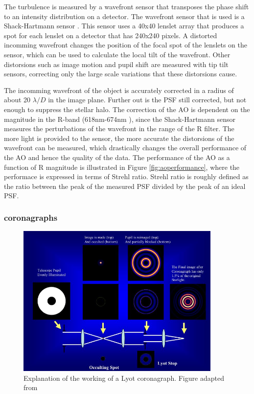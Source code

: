\documentclass[twoside,single]{lion-msc}
\begin{document}
The turbulence is measured by a wavefront sensor that transposes the phase shift to an intensity distribution on a detector. The wavefront sensor that is used is a Shack-Hartmann sensor \citep{Anugu2013}. This sensor uses a 40x40 lenslet array that produces a spot for each lenslet on a detector that has 240x240 pixels. A distorted incomming wavefront changes the position of the focal spot of the lenslets on the sensor, which can be used to calculate the local tilt of the wavefront. Other distorsions such as image motion and pupil shift are measured with tip tilt sensors, correcting only the large scale variations that these distorsions cause.
\bigskip

The incomming wavefront of the object is accurately corrected in a radius of about 20 $\lambda/D$ in the image plane. Further out is the PSF still corrected, but not enough to suppress the stellar halo. The correction of the AO is dependent on the magnitude in the R-band (618nm-674nm \citep{Mouillet2013}), since the Shack-Hartmann sensor measures the perturbations of the wavefront in the range of the R filter. The more light is provided to the sensor, the more accurate the distorsions of the wavefront can be measured, which drastically changes the overall performance of the AO and hence the quality of the data. The performance of the AO as a function of R magnitude is illustrated in Figure \ref{fig:aoperformance}, where the performace is expressed in terms of Strehl ratio. Strehl ratio is roughly defined as the ratio between the peak of the measured PSF divided by the peak of an ideal PSF.

\subsubsection{coronagraphs}
\begin{figure}[!b]
\centering
\includegraphics[trim={0cm 0cm 0cm 0cm},clip,width = 0.9\textwidth]{coronagraph}
\caption{Explanation of the working of a Lyot coronagraph. Figure adapted from \citep{Sivaramakrishnan2001}}
\label{fig:coronagraph}
\end{figure}
\end{document}
